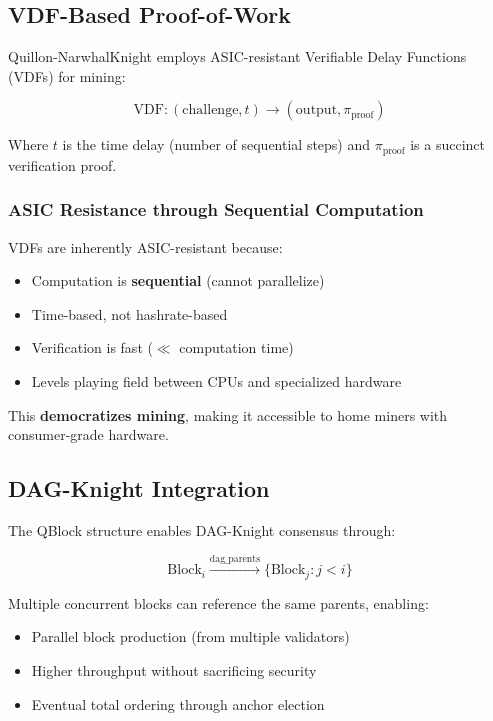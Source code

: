 \documentclass[11pt,a4paper]{article}
\begin{document}
\subsection{VDF-Based Proof-of-Work}

Quillon-NarwhalKnight employs ASIC-resistant Verifiable Delay Functions (VDFs) for mining:

\begin{equation}
\text{VDF}: (\text{challenge}, t) \rightarrow (\text{output}, \pi_{\text{proof}})
\end{equation}

Where $t$ is the time delay (number of sequential steps) and $\pi_{\text{proof}}$ is a succinct verification proof.

\subsubsection{ASIC Resistance through Sequential Computation}

VDFs are inherently ASIC-resistant because:
\begin{itemize}
    \item Computation is \textbf{sequential} (cannot parallelize)
    \item Time-based, not hashrate-based
    \item Verification is fast ($\ll$ computation time)
    \item Levels playing field between CPUs and specialized hardware
\end{itemize}

This \textbf{democratizes mining}, making it accessible to home miners with consumer-grade hardware.

\subsection{DAG-Knight Integration}

The QBlock structure enables DAG-Knight consensus through:

\begin{equation}
\text{Block}_i \xrightarrow{\text{dag\_parents}} \{\text{Block}_j : j < i\}
\end{equation}

Multiple concurrent blocks can reference the same parents, enabling:
\begin{itemize}
    \item Parallel block production (from multiple validators)
    \item Higher throughput without sacrificing security
    \item Eventual total ordering through anchor election
\end{itemize}
\end{document}
